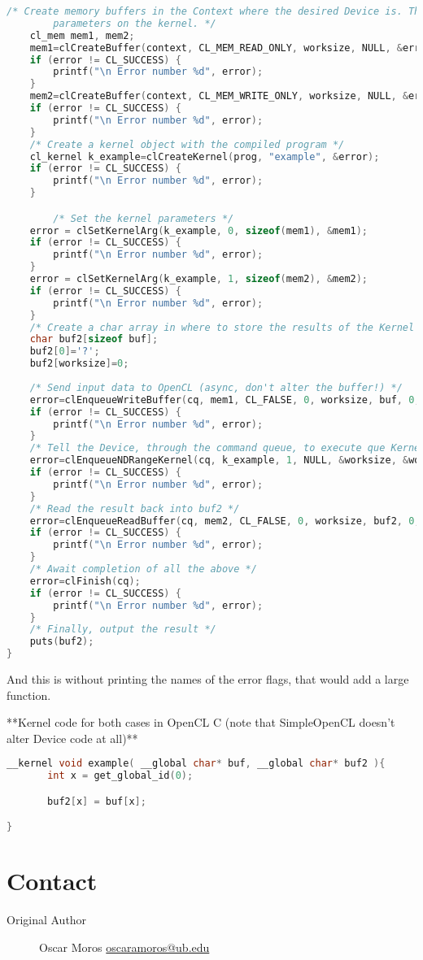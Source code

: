\documentclass{article}
\begin{document}
\begin{lstlisting}[language=c]
	/* Create memory buffers in the Context where the desired Device is. These will be the pointer 
        parameters on the kernel. */
	cl_mem mem1, mem2;
	mem1=clCreateBuffer(context, CL_MEM_READ_ONLY, worksize, NULL, &error);
	if (error != CL_SUCCESS) {
		printf("\n Error number %d", error);
	}
	mem2=clCreateBuffer(context, CL_MEM_WRITE_ONLY, worksize, NULL, &error);
	if (error != CL_SUCCESS) {
		printf("\n Error number %d", error);
	}
	/* Create a kernel object with the compiled program */
	cl_kernel k_example=clCreateKernel(prog, "example", &error);
	if (error != CL_SUCCESS) {
		printf("\n Error number %d", error);
	}

        /* Set the kernel parameters */
	error = clSetKernelArg(k_example, 0, sizeof(mem1), &mem1);
	if (error != CL_SUCCESS) {
		printf("\n Error number %d", error);
	}
	error = clSetKernelArg(k_example, 1, sizeof(mem2), &mem2);
	if (error != CL_SUCCESS) {
		printf("\n Error number %d", error);
	}
	/* Create a char array in where to store the results of the Kernel */
	char buf2[sizeof buf];
	buf2[0]='?';
	buf2[worksize]=0;
    
	/* Send input data to OpenCL (async, don't alter the buffer!) */
	error=clEnqueueWriteBuffer(cq, mem1, CL_FALSE, 0, worksize, buf, 0, NULL, NULL);
	if (error != CL_SUCCESS) {
		printf("\n Error number %d", error);
	}
	/* Tell the Device, through the command queue, to execute que Kernel */
	error=clEnqueueNDRangeKernel(cq, k_example, 1, NULL, &worksize, &worksize, 0, NULL, NULL);
	if (error != CL_SUCCESS) {
		printf("\n Error number %d", error);
	}
	/* Read the result back into buf2 */
	error=clEnqueueReadBuffer(cq, mem2, CL_FALSE, 0, worksize, buf2, 0, NULL, NULL);
	if (error != CL_SUCCESS) {
		printf("\n Error number %d", error);
	}
	/* Await completion of all the above */
	error=clFinish(cq);
	if (error != CL_SUCCESS) {
		printf("\n Error number %d", error);
	}
	/* Finally, output the result */
	puts(buf2);
}
\end{lstlisting}

And this is without printing the names of the error flags, that would add a large function.

**Kernel code for both cases in OpenCL C (note that SimpleOpenCL doesn't alter Device code at all)**

\begin{lstlisting}[language=c]
__kernel void example( __global char* buf, __global char* buf2 ){
       int x = get_global_id(0);

       buf2[x] = buf[x];

}
\end{lstlisting}

\section{Contact}
\begin{description}
  \item[Original Author] Oscar Moros
\href{mailto:oscaramoros@ub.edu}{oscaramoros@ub.edu}
\end{description}
\end{document}
